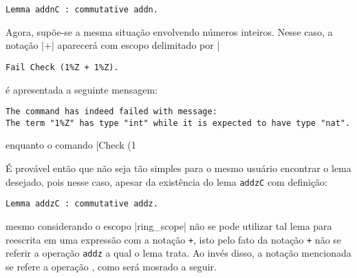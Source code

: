     \begin{lstlisting}[language=coq,frame=single,tabsize=1]
Lemma addnC : commutative addn.
    \end{lstlisting}
Agora, supõe-se a mesma situação envolvendo números inteiros. Nesse caso, a notação \coqinline|+| aparecerá com escopo delimitado por \coqinline|%
    \begin{lstlisting}[language=coq,frame=single,tabsize=1]
Fail Check (1%Z + 1%Z).
    \end{lstlisting}
é apresentada a seguinte mensagem:
    \begin{lstlisting}[language=coq-error,frame=single,tabsize=1]
The command has indeed failed with message:
The term "1%Z" has type "int" while it is expected to have type "nat".
    \end{lstlisting}
enquanto o comando \coqinline|Check (1%

É provável então que não seja tão simples para o mesmo usuário encontrar o lema desejado, pois nesse caso, apesar da existência do lema \lstinline[language = coq]!addzC! com definição:
    \begin{lstlisting}[language=coq,frame=single,tabsize=1]
Lemma addzC : commutative addz.
    \end{lstlisting}
mesmo considerando o escopo \coqinline|ring_scope| não se pode utilizar tal lema para reescrita em uma expressão com a notação \lstinline[language = coq]!+!, isto pelo fato da notação \lstinline[language = coq]!+! não se referir a operação \lstinline[language = coq]!addz! a qual o lema trata. Ao invés disso, a notação mencionada se refere a operação , como será mosrado a seguir.

